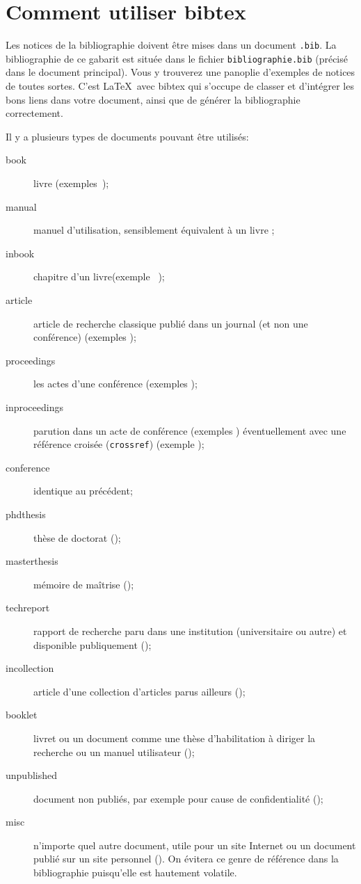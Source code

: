 
\chapter{Comment utiliser bibtex}
\label{app:bibtex}

Les notices de la bibliographie doivent \^etre mises dans un document \texttt{.bib}. La bibliographie de ce gabarit est située dans le fichier \texttt{bibliographie.bib} (précisé dans le document principal). Vous y trouverez une panoplie d'exemples de notices de toutes sortes. C'est \LaTeX~avec bibtex qui s'occupe de classer et d'int\'egrer les bons liens dans votre document, ainsi que de g\'en\'erer la bibliographie correctement.

Il y a plusieurs types de documents pouvant \^etre utilis\'es:
\begin{description}
	\item[book] livre (exemples~\cite{Abr.96-BBook,Hoa.85-CSP, Jac.83-JSD,Mil.89-CCS});
	\item[manual] manuel d'utilisation, sensiblement \'equivalent \`a un livre \cite{STE.97-Manuel-B};
	\item[inbook] chapitre d'un livre(exemple ~\cite{Ch.96-Programmer-avec-Scheme, kevorkian90});
	\item[article] article de recherche classique publi\'e dans un journal (et non une conf\'erence) (exemples \cite{Bo.84-VVS,FFL.05-SOSYM,FSd.03-eb3});
	\item[proceedings] les actes d'une conf\'erence (exemples \cite{ArGnMa.03-FME, LeWe.09-IFM});
	\item[inproceedings] parution dans un acte de conf\'erence (exemples \cite{Matra.99-Meteor,FF.07-ICFEM,Pn.79-The-Temporal-Semantics-of-Concurrent-Programs}) \'eventuellement avec une r\'ef\'erence crois\'ee  (\texttt{crossref}) (exemple \cite{LeBu.03-ProB});
	\item[conference] identique au pr\'ec\'edent;
	\item[phdthesis] th\`ese de doctorat (\cite{FRA.06-thesis});
	\item[masterthesis] m\'emoire de ma\^itrise (\cite{Ri.01-EB3});
	\item[techreport] rapport de recherche paru dans une institution (universitaire ou autre) et disponible publiquement (\cite{FRA.05-TR9});
	\item[incollection] article d'une collection d'articles parus ailleurs (\cite{BB.89-LOTOS, CitekeyIncollection});
	\item[booklet] livret ou un document comme une th\`ese d'habilitation \`a diriger la recherche ou un manuel utilisateur (\cite{La.02-CDBD,STE.97-Manuel-B});
	\item[unpublished] document non publi\'es, par exemple pour cause de confidentialit\'e (\cite{deschenes98, BuDo.99-guide-B});
	\item[misc] n'importe quel autre document, utile pour un site Internet ou un document publié sur un site personnel (\cite{INRIA.cadp, Gi.08-Logic-Vs.-Intelligence}). On évitera ce genre de référence dans la bibliographie puisqu'elle est hautement volatile.
\end{description}

